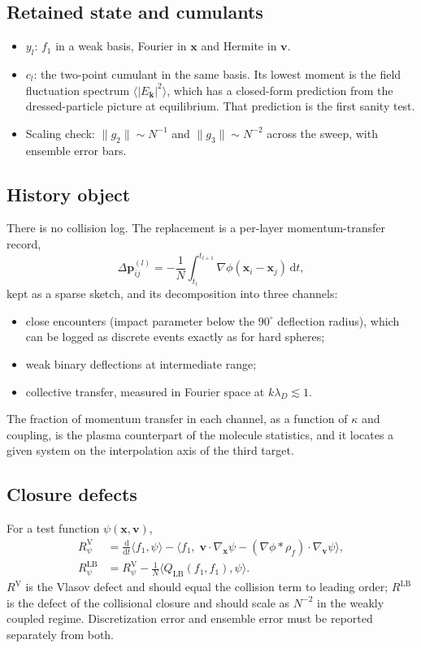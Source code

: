 \documentclass[11pt]{article}
\newcommand{\dd}{\mathrm{d}}
\newcommand{\bx}{\mathbf{x}}
\newcommand{\bv}{\mathbf{v}}
\newcommand{\bk}{\mathbf{k}}
\newcommand{\avg}[1]{\langle #1 \rangle}
\theoremstyle{definition}
\begin{document}
\subsection{Retained state and cumulants}

\begin{itemize}
  \item $y_l$: $f_1$ in a weak basis, Fourier in $\bx$ and Hermite in $\bv$.
  \item $c_l$: the two-point cumulant in the same basis. Its lowest moment is
    the field fluctuation spectrum $\avg{|E_{\bk}|^2}$, which has a
    closed-form prediction from the dressed-particle picture at equilibrium.
    That prediction is the first sanity test.
  \item Scaling check: $\|g_2\|\sim N^{-1}$ and $\|g_3\|\sim N^{-2}$ across
    the sweep, with ensemble error bars.
\end{itemize}

\subsection{History object}

There is no collision log. The replacement is a per-layer momentum-transfer
record,
\begin{equation}
  \Delta\mathbf{p}_{ij}^{(l)} = -\frac{1}{N}\int_{t_l}^{t_{l+1}}
    \nabla\phi(\bx_i - \bx_j)\,\dd t ,
\end{equation}
kept as a sparse sketch, and its decomposition into three channels:
\begin{itemize}
  \item close encounters (impact parameter below the $90^\circ$ deflection
    radius), which can be logged as discrete events exactly as for hard
    spheres;
  \item weak binary deflections at intermediate range;
  \item collective transfer, measured in Fourier space at
    $k\lambda_D \lesssim 1$.
\end{itemize}
The fraction of momentum transfer in each channel, as a function of $\kappa$
and coupling, is the plasma counterpart of the molecule statistics, and it
locates a given system on the interpolation axis of the third target.

\subsection{Closure defects}

For a test function $\psi(\bx,\bv)$,
\begin{align}
  R^{\mathrm{V}}_\psi &= \frac{\dd}{\dd t}\avg{f_1,\psi}
     - \avg{f_1,\;\bv\cdot\nabla_{\bx}\psi
       - (\nabla\phi*\rho_f)\cdot\nabla_{\bv}\psi}, \\
  R^{\mathrm{LB}}_\psi &= R^{\mathrm{V}}_\psi
     - \frac{1}{N}\avg{Q_{\mathrm{LB}}(f_1,f_1),\psi} .
\end{align}
$R^{\mathrm{V}}$ is the Vlasov defect and should equal the collision term to
leading order; $R^{\mathrm{LB}}$ is the defect of the collisional closure and
should scale as $N^{-2}$ in the weakly coupled regime. Discretization error
and ensemble error must be reported separately from both.
\end{document}
